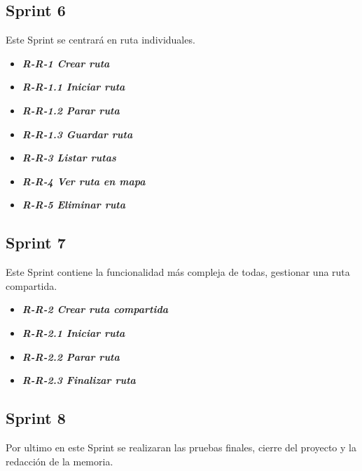 \subsection{Sprint 6}
Este Sprint se centrará en ruta individuales.

\begin{itemize}
\item \textbf{\textit{R-R-1 Crear ruta}}
\item \textbf{\textit{R-R-1.1 Iniciar ruta}}
\item\textbf{ \textit{R-R-1.2 Parar ruta}}
\item \textbf{\textit{R-R-1.3 Guardar ruta}}
\item \textbf{\textit{R-R-3 Listar rutas} }
\item \textbf{\textit{R-R-4 Ver ruta en mapa}}
\item \textbf{\textit{R-R-5 Eliminar ruta}}
\end{itemize}

\subsection{Sprint 7}
Este Sprint contiene la funcionalidad más compleja de todas, gestionar una ruta compartida.

\begin{itemize}
\item \textbf{\textit{R-R-2 Crear ruta compartida}}
\item \textbf{\textit{R-R-2.1 Iniciar ruta}}
\item \textbf{\textit{R-R-2.2 Parar ruta}}
\item \textbf{\textit{R-R-2.3 Finalizar ruta}}
\end{itemize}

\subsection{Sprint 8}

Por ultimo en este Sprint se realizaran las pruebas finales, cierre del proyecto y la redacción de la memoria.

